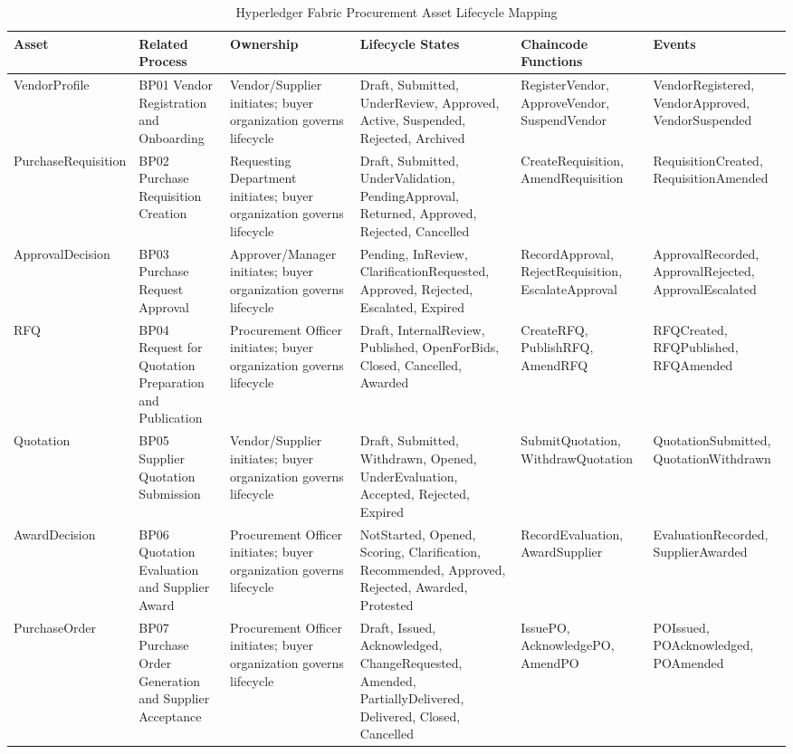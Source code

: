 \documentclass[conference]{IEEEtran}
\begin{document}
\begin{table}[t]
\caption{Hyperledger Fabric Procurement Asset Lifecycle Mapping}
\label{tab:assets}
\tiny
\begin{tabularx}{\textwidth}{|L{2.0cm}|L{2.5cm}|Y|Y|L{2.5cm}|L{2.5cm}|}
\hline
\textbf{Asset} & \textbf{Related Process} & \textbf{Ownership} & \textbf{Lifecycle States} & \textbf{Chaincode Functions} & \textbf{Events} \\ \hline
VendorProfile & BP01 Vendor Registration and Onboarding & Vendor/Supplier initiates; buyer organization governs lifecycle & Draft, Submitted, UnderReview, Approved, Active, Suspended, Rejected, Archived & RegisterVendor, ApproveVendor, SuspendVendor & VendorRegistered, VendorApproved, VendorSuspended \\ \hline
PurchaseRequisition & BP02 Purchase Requisition Creation & Requesting Department initiates; buyer organization governs lifecycle & Draft, Submitted, UnderValidation, PendingApproval, Returned, Approved, Rejected, Cancelled & CreateRequisition, AmendRequisition & RequisitionCreated, RequisitionAmended \\ \hline
ApprovalDecision & BP03 Purchase Request Approval & Approver/Manager initiates; buyer organization governs lifecycle & Pending, InReview, ClarificationRequested, Approved, Rejected, Escalated, Expired & RecordApproval, RejectRequisition, EscalateApproval & ApprovalRecorded, ApprovalRejected, ApprovalEscalated \\ \hline
RFQ & BP04 Request for Quotation Preparation and Publication & Procurement Officer initiates; buyer organization governs lifecycle & Draft, InternalReview, Published, OpenForBids, Closed, Cancelled, Awarded & CreateRFQ, PublishRFQ, AmendRFQ & RFQCreated, RFQPublished, RFQAmended \\ \hline
Quotation & BP05 Supplier Quotation Submission & Vendor/Supplier initiates; buyer organization governs lifecycle & Draft, Submitted, Withdrawn, Opened, UnderEvaluation, Accepted, Rejected, Expired & SubmitQuotation, WithdrawQuotation & QuotationSubmitted, QuotationWithdrawn \\ \hline
AwardDecision & BP06 Quotation Evaluation and Supplier Award & Procurement Officer initiates; buyer organization governs lifecycle & NotStarted, Opened, Scoring, Clarification, Recommended, Approved, Rejected, Awarded, Protested & RecordEvaluation, AwardSupplier & EvaluationRecorded, SupplierAwarded \\ \hline
PurchaseOrder & BP07 Purchase Order Generation and Supplier Acceptance & Procurement Officer initiates; buyer organization governs lifecycle & Draft, Issued, Acknowledged, ChangeRequested, Amended, PartiallyDelivered, Delivered, Closed, Cancelled & IssuePO, AcknowledgePO, AmendPO & POIssued, POAcknowledged, POAmended \\ \hline

\end{tabularx}
\end{table}
\end{document}
